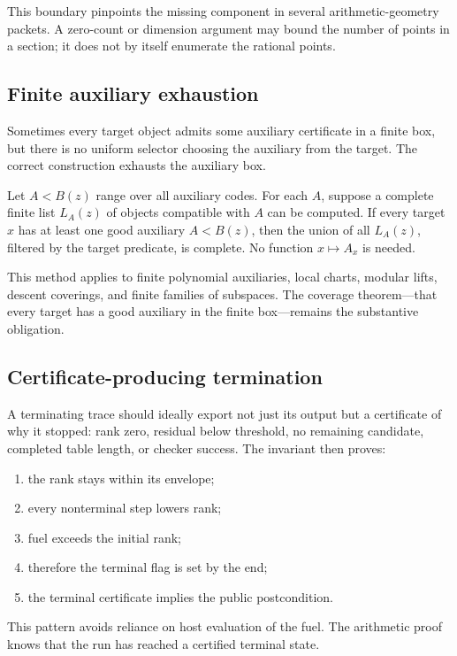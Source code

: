 This boundary pinpoints the missing component in several arithmetic-geometry
packets.  A zero-count or dimension argument may bound the number of points in
a section; it does not by itself enumerate the rational points.

\subsection{Finite auxiliary exhaustion}

Sometimes every target object admits some auxiliary certificate in a finite
box, but there is no uniform selector choosing the auxiliary from the target.
The correct construction exhausts the auxiliary box.

Let \(A<B(z)\) range over all auxiliary codes.  For each \(A\), suppose a
complete finite list \(L_A(z)\) of objects compatible with \(A\) can be
computed.  If every target \(x\) has at least one good auxiliary
\(A<B(z)\), then the union of all \(L_A(z)\), filtered by the target predicate,
is complete.  No function \(x\mapsto A_x\) is needed.

This method applies to finite polynomial auxiliaries, local charts, modular
lifts, descent coverings, and finite families of subspaces.  The coverage
theorem---that every target has a good auxiliary in the finite box---remains
the substantive obligation.

\subsection{Certificate-producing termination}

A terminating trace should ideally export not just its output but a certificate
of why it stopped: rank zero, residual below threshold, no remaining
candidate, completed table length, or checker success.  The invariant then
proves:
\begin{enumerate}
\item the rank stays within its envelope;
\item every nonterminal step lowers rank;
\item fuel exceeds the initial rank;
\item therefore the terminal flag is set by the end;
\item the terminal certificate implies the public postcondition.
\end{enumerate}

This pattern avoids reliance on host evaluation of the fuel.  The arithmetic
proof knows that the run has reached a certified terminal state.

